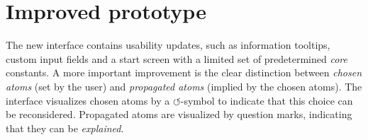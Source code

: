  \section{Improved prototype}
\label{interface}

The new interface contains usability updates, such as information tooltips, custom input fields and a start screen with a limited set of predetermined \emph{core} constants.
A more important improvement is the clear distinction between  \emph{chosen atoms} (set by the user) and  \emph{propagated atoms} (implied by the chosen atoms).
The interface visualizes chosen atoms by a $\circlearrowleft$-symbol to indicate that this choice can be reconsidered. Propagated atoms are visualized by question marks, indicating that they can be \emph{explained}.

